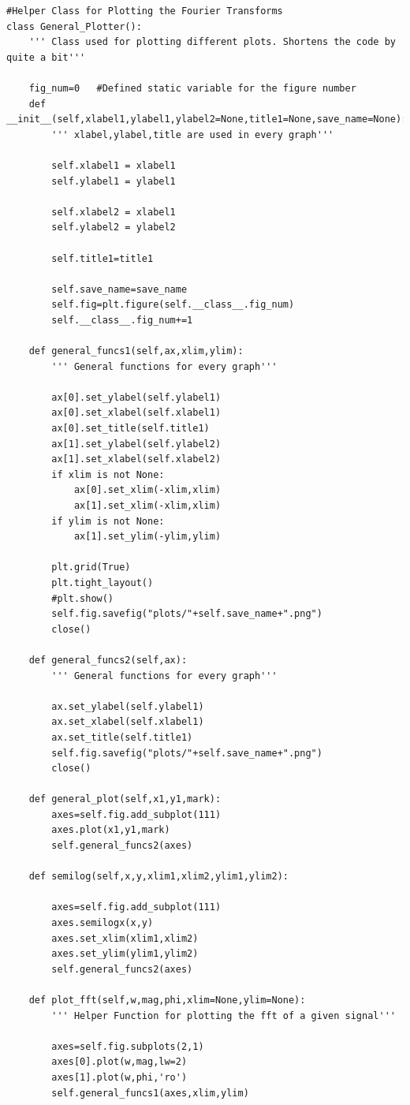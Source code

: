 \documentclass{article}
\begin{document}
\begin{lstlisting}
#Helper Class for Plotting the Fourier Transforms
class General_Plotter():
    ''' Class used for plotting different plots. Shortens the code by quite a bit'''
    
    fig_num=0   #Defined static variable for the figure number
    def __init__(self,xlabel1,ylabel1,ylabel2=None,title1=None,save_name=None):
        ''' xlabel,ylabel,title are used in every graph''' 

        self.xlabel1 = xlabel1
        self.ylabel1 = ylabel1
        
        self.xlabel2 = xlabel1
        self.ylabel2 = ylabel2
        
        self.title1=title1

        self.save_name=save_name
        self.fig=plt.figure(self.__class__.fig_num)
        self.__class__.fig_num+=1

    def general_funcs1(self,ax,xlim,ylim):
        ''' General functions for every graph'''
        
        ax[0].set_ylabel(self.ylabel1)
        ax[0].set_xlabel(self.xlabel1)
        ax[0].set_title(self.title1)
        ax[1].set_ylabel(self.ylabel2)
        ax[1].set_xlabel(self.xlabel2)
        if xlim is not None:
            ax[0].set_xlim(-xlim,xlim)
            ax[1].set_xlim(-xlim,xlim)
        if ylim is not None:
            ax[1].set_ylim(-ylim,ylim)

        plt.grid(True)
        plt.tight_layout()
        #plt.show()
        self.fig.savefig("plots/"+self.save_name+".png")
        close()
    
    def general_funcs2(self,ax):
        ''' General functions for every graph'''
        
        ax.set_ylabel(self.ylabel1)
        ax.set_xlabel(self.xlabel1)
        ax.set_title(self.title1)
        self.fig.savefig("plots/"+self.save_name+".png")
        close()
    
    def general_plot(self,x1,y1,mark):
        axes=self.fig.add_subplot(111)
        axes.plot(x1,y1,mark)
        self.general_funcs2(axes)

    def semilog(self,x,y,xlim1,xlim2,ylim1,ylim2):
        
        axes=self.fig.add_subplot(111)
        axes.semilogx(x,y)
        axes.set_xlim(xlim1,xlim2)
        axes.set_ylim(ylim1,ylim2)
        self.general_funcs2(axes)

    def plot_fft(self,w,mag,phi,xlim=None,ylim=None):
        ''' Helper Function for plotting the fft of a given signal'''
        
        axes=self.fig.subplots(2,1)
        axes[0].plot(w,mag,lw=2)
        axes[1].plot(w,phi,'ro')
        self.general_funcs1(axes,xlim,ylim)

\end{lstlisting}
\end{document}

